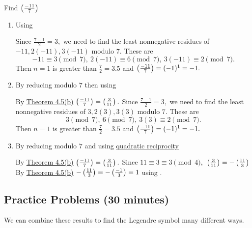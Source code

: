 \documentclass[letterpaper, 11 pt]{ximera}
\begin{document}
\begin{example}
	Find $\left(\frac{-11}{7}\right)$
		
	\begin{enumerate}
		\item Using 
			
		\begin{solution}
			Since $\frac{7-1}{2}=3,$ we need to find the least nonnegative residues of $-11,2(-11),3(-11)$ modulo $7.$ These are \[-11\equiv 3\pmod{7},\ 2(-11)\equiv 6\pmod{7},\ 3(-11)\equiv 2\pmod{7}.\]
			Then $n=1$ is greater than $\frac{7}{2}=3.5$ and $\left(\frac{-11}{7}\right)=(-1)^1=-1.$
		\end{solution}

		\item By reducing modulo $7$ then using 
			
		\begin{solution}
			By \hyperref[legendre-respects-mod]{Theorem 4.5(b)} $\left(\frac{-11}{7}\right)=\left(\frac{3}{11}\right).$
			Since $\frac{7-1}{2}=3,$ we need to find the least nonnegative residues of $3,2(3),3(3)$ modulo $7.$ These are \[3\pmod{7},\ 6\pmod{7},\ 3(3)\equiv 2\pmod{7}.\]
			Then $n=1$ is greater than $\frac{7}{2}=3.5$ and $\left(\frac{-11}{7}\right)=(-1)^1=-1.$
		\end{solution}

		\item By reducing modulo $7$ and using \hyperref[quad-rec-useful-form]{quadratic reciprocity}
			
		\begin{solution}
			By \hyperref[legendre-respects-mod]{Theorem 4.5(b)} $\left(\frac{-11}{7}\right)=\left(\frac{3}{11}\right).$ Since $11\equiv 3\equiv 3\pmod{4},$ $\left(\frac{3}{11}\right)=-\left(\frac{11}{3}\right)$ By \hyperref[legendre-respects-mod]{Theorem 4.5(b)} $-\left(\frac{11}{3}\right)=-\left(\frac{-1}{3}\right)=1$ using .
		\end{solution}
	\end{enumerate}
\end{example}

\subsection{Practice Problems (30 minutes)}
We can combine these results to find the Legendre symbol many different ways.
\end{document}
